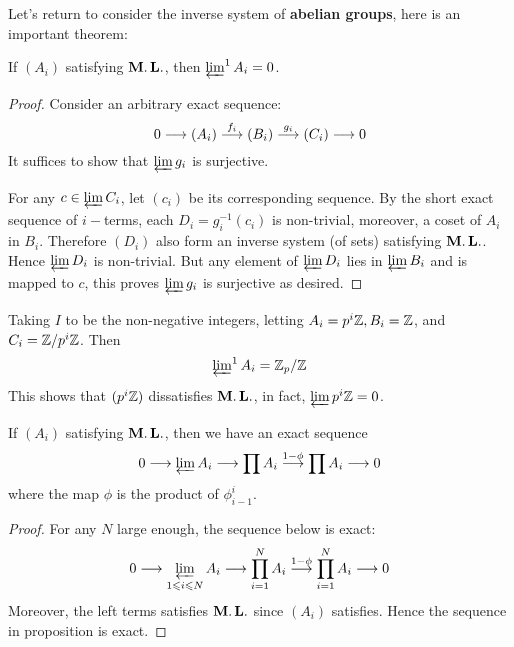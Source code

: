   Let's return to consider the inverse system of \textbf{abelian groups}, here is an important theorem:
  \begin{thm}
    If $(A_i)$ satisfying $\operatorname{\mathbf{M.L.}}$, then $\operatorname*{\underleftarrow{\lim}}^1 A_i=0$.
  \end{thm}
  \begin{proof}
    Consider an arbitrary exact sequence:
    \begin{equation*}
      0 \longrightarrow (A_i) \stackrel{{f_i}}{\longrightarrow} (B_i) \stackrel{{g_i}}{\longrightarrow} (C_i) \longrightarrow 0
    \end{equation*}
    It suffices to show that $\operatorname*{\underleftarrow{\lim}} g_i$ is surjective.

    For any $c\in\operatorname*{\underleftarrow{\lim}} C_i$, let $(c_i)$ be its corresponding sequence.
    By the short exact sequence of $i-$terms, each $D_i=g_i^{-1}(c_i)$ is non-trivial, moreover, a coset of $A_i$ in $B_i$.
    Therefore $(D_i)$ also form an inverse system (of sets) satisfying $\operatorname{\mathbf{M.L.}}$. Hence $\operatorname*{\underleftarrow{\lim}} D_i$ is non-trivial.
    But any element of $\operatorname*{\underleftarrow{\lim}} D_i$ lies in $\operatorname*{\underleftarrow{\lim}} B_i$ and is mapped to $c$, this proves $\operatorname*{\underleftarrow{\lim}} g_i$ is surjective as desired.
  \end{proof}

  \begin{exam}
    Taking $I$ to be the non-negative integers, letting $A_i = p^i{\mathbb Z}, B_i = {\mathbb Z}$, and $C_i = {\mathbb Z}/p^i{\mathbb Z}$. Then
    \begin{equation*}
      \operatorname*{\underleftarrow{\lim}}\nolimits^1 A_i = {\mathbb Z}_p/{\mathbb Z}
    \end{equation*}
    This shows that $(p^i{\mathbb Z})$ dissatisfies $\operatorname{\mathbf{M.L.}}$, in fact, $\operatorname*{\underleftarrow{\lim}} p^i{\mathbb Z}=0$.
  \end{exam}

  \begin{prop}
    If $(A_i)$ satisfying $\operatorname{\mathbf{M.L.}}$, then we have an exact sequence
    \begin{equation*}
      0 \longrightarrow \operatorname*{\underleftarrow{\lim}} A_i \longrightarrow \prod A_i \stackrel{{1-\phi}}{\longrightarrow} \prod A_i \longrightarrow 0
    \end{equation*}
    where the map $\phi$ is the product of $\phi^i_{i-1}$.
  \end{prop}
  \begin{proof}
    For any $N$ large enough, the sequence below is exact:
    \begin{equation*}
      0 \longrightarrow \operatorname*{\underleftarrow{\lim}}_{1\leqslant i\leqslant N} A_i \longrightarrow \prod_{i=1}^N A_i \stackrel{{1-\phi}}{\longrightarrow} \prod_{i=1}^N A_i \longrightarrow 0
    \end{equation*}
    Moreover, the left terms satisfies $\operatorname{\mathbf{M.L.}}$ since $(A_i)$ satisfies. Hence the sequence in proposition is exact.
  \end{proof}


